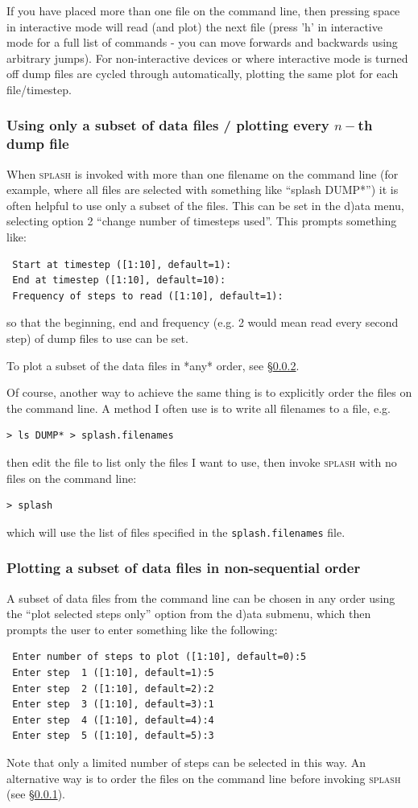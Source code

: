 \documentclass[a4paper,10pt]{article}
\newcommand{\splash}{\textsc{splash }}
\begin{document}
 If you have placed more than one file on the command line, then pressing space in interactive mode will read (and plot) the next file (press 'h' in interactive mode for a full list of commands - you can move forwards and backwards using arbitrary jumps). For non-interactive devices or where interactive mode is turned off dump files are cycled through automatically, plotting the same plot for each file/timestep.
 
\subsubsection{ Using only a subset of data files / plotting every $n-$th dump file}
\label{sec:subsetofsteps}
 When \splash is invoked with more than one filename on the command line (for example, where all files are selected with something like ``splash DUMP*'') it is often helpful to use only a subset of the files. This can be set in the d)ata menu, selecting option 2 ``change number of timesteps used''. This prompts something like:
\begin{verbatim}
 Start at timestep ([1:10], default=1):
 End at timestep ([1:10], default=10):
 Frequency of steps to read ([1:10], default=1):
\end{verbatim}
so that the beginning, end and frequency (e.g. 2 would mean read every second step) of dump files to use can be set.

 To plot a subset of the data files in *any* order, see \S\ref{sec:selectedstepsonly}. 

 Of course, another way to achieve the same thing is to explicitly order the files on the command line. A method I often use is to write all filenames to a file, e.g. 
\begin{verbatim}
> ls DUMP* > splash.filenames
\end{verbatim}
then edit the file to list only the files I want to use, then invoke \splash with no files on the command line:
\begin{verbatim}
> splash
\end{verbatim}
which will use the list of files specified in the \verb+splash.filenames+ file.

\subsubsection{ Plotting a subset of data files in non-sequential order}
\label{sec:selectedstepsonly}
 A subset of data files from the command line can be chosen in any order using the ``plot selected steps only'' option from the d)ata submenu, which then prompts the user to enter something like the following:
\begin{verbatim}
 Enter number of steps to plot ([1:10], default=0):5
 Enter step  1 ([1:10], default=1):5
 Enter step  2 ([1:10], default=2):2
 Enter step  3 ([1:10], default=3):1
 Enter step  4 ([1:10], default=4):4
 Enter step  5 ([1:10], default=5):3
\end{verbatim}
Note that only a limited number of steps can be selected in this way. An alternative way is to order the files on the command line before invoking \splash (see \S\ref{sec:subsetofsteps}). 
\end{document}
